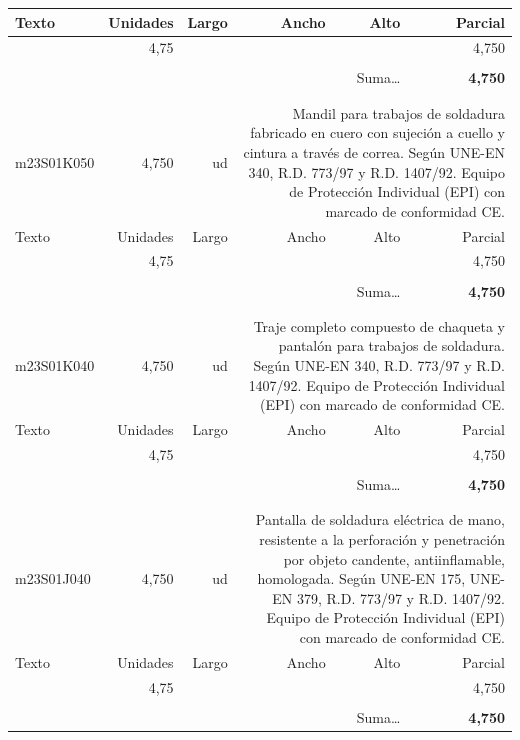 \documentclass{book}%
\begin{document}
\begin{longtable}{lrrrrr}
Texto&Unidades&Largo&Ancho&Alto&Parcial\\%
\hline%
\multicolumn{1}{p{3.5cm}}{ }&4,75&&&&     4,750\\%
&&&&&\\%
\multicolumn{5}{r}{Suma\ldots}&\textbf{     4,750}\\%
\hline%
&&&&&\\%
&&&&&\\%
m23S01K050&     4,750& ud&\multicolumn{3}{p{6cm}}{\scriptsize Mandil para trabajos de soldadura fabricado en cuero con sujeción a cuello y cintura a través de correa. Según UNE-EN 340, R.D. 773/97 y R.D. 1407/92. Equipo de Protección Individual (EPI) con marcado de conformidad CE.\normalsize}\\%
Texto&Unidades&Largo&Ancho&Alto&Parcial\\%
\hline%
\multicolumn{1}{p{3.5cm}}{ }&4,75&&&&     4,750\\%
&&&&&\\%
\multicolumn{5}{r}{Suma\ldots}&\textbf{     4,750}\\%
\hline%
&&&&&\\%
&&&&&\\%
m23S01K040&     4,750& ud&\multicolumn{3}{p{6cm}}{\scriptsize Traje completo compuesto de chaqueta y pantalón para trabajos de soldadura. Según UNE-EN 340, R.D. 773/97 y R.D. 1407/92. Equipo de Protección Individual (EPI) con marcado de conformidad CE.\normalsize}\\%
Texto&Unidades&Largo&Ancho&Alto&Parcial\\%
\hline%
\multicolumn{1}{p{3.5cm}}{ }&4,75&&&&     4,750\\%
&&&&&\\%
\multicolumn{5}{r}{Suma\ldots}&\textbf{     4,750}\\%
\hline%
&&&&&\\%
&&&&&\\%
m23S01J040&     4,750& ud&\multicolumn{3}{p{6cm}}{\scriptsize Pantalla de soldadura eléctrica de mano, resistente a la perforación y penetración por objeto candente, antiinflamable, homologada. Según UNE-EN 175, UNE-EN 379, R.D. 773/97 y R.D. 1407/92. Equipo de Protección Individual (EPI) con marcado de conformidad CE.\normalsize}\\%
Texto&Unidades&Largo&Ancho&Alto&Parcial\\%
\hline%
\multicolumn{1}{p{3.5cm}}{ }&4,75&&&&     4,750\\%
&&&&&\\%
\multicolumn{5}{r}{Suma\ldots}&\textbf{     4,750}\\%

\end{longtable}
\end{document}
